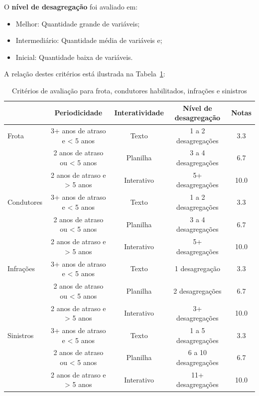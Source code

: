 \documentclass[
  a4paper,
]{article}
\begin{document}
O \textbf{nível de desagregação} foi avaliado em:

\begin{itemize}
\item
  Melhor: Quantidade grande de variáveis;
\item
  Intermediário: Quantidade média de variáveis e;
\item
  Inicial: Quantidade baixa de variáveis.
\end{itemize}

A relação destes critérios está ilustrada na Tabela~\ref{tbl-criterios}:

\break

\begin{longtable}{l|cccc}

\caption{\label{tbl-criterios}Critérios de avaliação para frota,
condutores habilitados, infrações e sinistros}

\tabularnewline

\toprule
\multicolumn{1}{l}{} & Periodicidade & Interatividade & Nível de desagregação & Notas \\ 
\midrule\addlinespace[2.5pt]
Frota & 3+ anos de atraso e < 5 anos & Texto & 1 a 2 desagregações & 3.3 \\ 
 & 2 anos de atraso ou < 5 anos & Planilha & 3 a 4 desagregações & 6.7 \\ 
 & 2 anos de atraso e > 5 anos & Interativo & 5+ desagregações & 10.0 \\ 
\midrule\addlinespace[2.5pt]
Condutores & 3+ anos de atraso e < 5 anos & Texto & 1 a 2 desagregações & 3.3 \\ 
 & 2 anos de atraso ou < 5 anos & Planilha & 3 a 4 desagregações & 6.7 \\ 
 & 2 anos de atraso e > 5 anos & Interativo & 5+ desagregações & 10.0 \\ 
\midrule\addlinespace[2.5pt]
Infrações & 3+ anos de atraso e < 5 anos & Texto & 1 desagregação & 3.3 \\ 
 & 2 anos de atraso ou < 5 anos & Planilha & 2 desagregações & 6.7 \\ 
 & 2 anos de atraso e > 5 anos & Interativo & 3+ desagregações & 10.0 \\ 
\midrule\addlinespace[2.5pt]
Sinistros & 3+ anos de atraso e < 5 anos & Texto & 1 a 5 desagregações & 3.3 \\ 
 & 2 anos de atraso ou < 5 anos & Planilha & 6 a 10 desagregações & 6.7 \\ 
 & 2 anos de atraso e > 5 anos & Interativo & 11+ desagregações & 10.0 \\ 
\bottomrule

\end{longtable}
\end{document}
